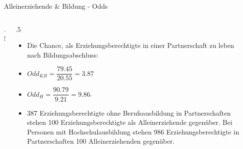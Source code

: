 \documentclass[18pt,handout, aspectratio=169]{beamer}
\begin{document}
\begin{frame}{Alleinerziehende \& Bildung - Odds}
\begin{columns}

\begin{column}{.5\linewidth}
\end{column}

\begin{column}{.5\linewidth}
\small
\begin{itemize}
  \item Die Chance, als Erziehungsberechtigte in einer Partnerschaft zu leben nach Bildungsabschluss:
  \item[] $Odd_{KB} = \dfrac{79.45}{20.55} = 3.87$\\[.1em]
  \item[] $Odd_{H} = \dfrac{90.79}{9.21} = 9.86 $. 
  \item[] 387 Erziehungsberechtigte ohne Berufsausbildung in Partnerschaften stehen 100 Erziehungsberechtigte als Alleinerziehende gegenüber. Bei Personen mit Hochschulausbildung stehen 986 Erziehungsberechtigte in Partnerschaften 100 Alleinerziehenden gegenüber.  
\end{itemize}
\end{column}

\end{columns}
\end{frame}
\end{document}
